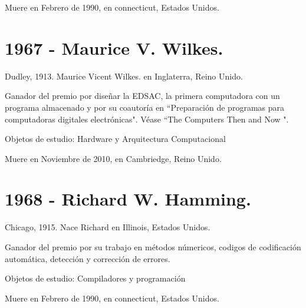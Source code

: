\documentclass[a4paper, 11pt]{article}
\begin{document}
\noindent Muere en Febrero de 1990, en connecticut, Estados Unidos.
\newline

\section*{1967 - Maurice V. Wilkes.}
\noindent Dudley, 1913. Maurice Vicent Wilkes. en Inglaterra, Reino Unido. 

\noindent Ganador del premio por diseñar la EDSAC, la primera computadora con un programa almacenado y por su coautoría en ``Preparación de programas para computadoras digitales electrónicas". Véase ``The Computers Then and Now ".

\noindent Objetos de estudio: Hardware y Arquitectura Computacional

\noindent Muere en Noviembre de 2010, en Cambriedge, Reino Unido.
\newline

\section*{1968 - Richard W. Hamming.}
\noindent Chicago, 1915. Nace Richard en Illinois, Estados Unidos.

\noindent Ganador del premio por su trabajo en métodos númericos, codigos de codificación automática, detección y corrección de errores. 

\noindent Objetos de estudio: Compiladores y programación

\noindent Muere en Febrero de 1990, en connecticut, Estados Unidos.
\newline
\end{document}
